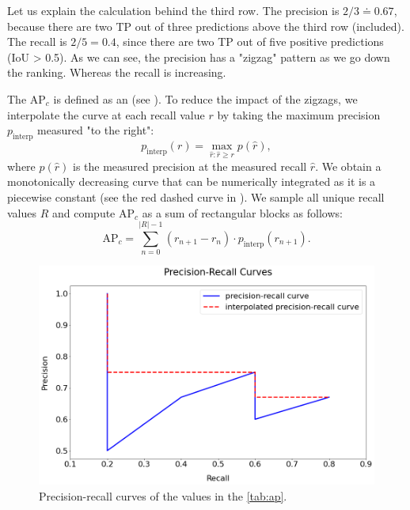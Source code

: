 Let us explain the calculation behind the third row. The precision is
$2/3 \doteq 0.67$, because there are two TP out of three predictions above the third
row (included). The recall is $2/5 = 0.4$, since there are two TP out of
five positive predictions (IoU > 0.5). As we can see, the precision has a "zigzag"
pattern as we go down the ranking. Whereas the recall is increasing.

The AP$_c$ is defined as an  (see
). To reduce the impact of the zigzags, we
interpolate the curve at each recall value $r$ by taking the maximum precision
$p_\text{interp}$ measured "to the right":
$$
    p_\text{interp}(r) = \max\limits_{\hat{r}:\hat{r} \geq r} p(\hat{r}),
$$
where $p(\hat{r})$ is the measured precision at the measured recall $\hat{r}$.
We obtain a monotonically decreasing curve that can be numerically integrated as
it is a piecewise constant (see the red dashed curve in ). We sample all unique recall values $R$ and compute
AP$_c$ as a sum of rectangular blocks as follows:
$$
    \text{AP}_c = \sum\limits^{\lvert R\rvert - 1}_{n = 0} (r_{n+1} - r_n)
    \cdot p_\text{interp}(r_{n+1}).
$$

\begin{figure}[H]
    \centering
    \includegraphics[width=0.8\linewidth]{Sources/Figures/precisionrecall.png}
    \caption{Precision-recall curves of the values in the \autoref{tab:ap}.}
    \label{fig:precisionrecall}
\end{figure}


